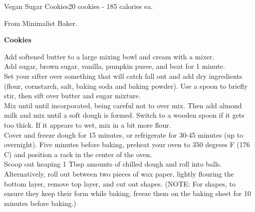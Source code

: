 \begin{recipe}{Vegan Sugar Cookies}{20 cookies - 185 calories ea.}{}

\freeform From Minimalist Baker.


\textbf{Cookies}

Add softened butter to a large mixing bowl and cream with a mixer.\\

Add sugar, brown sugar, vanilla, pumpkin puree, and beat for 1 minute.\\

Set your sifter over something that will catch fall out and add dry ingredients (flour, cornstarch, salt, baking soda and baking powder). Use a spoon to briefly stir, then sift over butter and sugar mixture.\\

Mix until until incorporated, being careful not to over mix. Then add almond milk and mix until a soft dough is formed. Switch to a wooden spoon if it gets too thick. If it appears to wet, mix in a bit more flour.\\

Cover and freeze dough for 15 minutes, or refrigerate for 30-45 minutes (up to overnight).
Five minutes before baking, preheat your oven to 350 degrees F (176 C) and position a rack in the center of the oven.\\

Scoop out heaping 1 Tbsp amounts of chilled dough and roll into balls. Alternatively, roll out between two pieces of wax paper, lightly flouring the bottom layer, remove top layer, and cut out shapes. (NOTE: For shapes, to ensure they keep their form while baking, freeze them on the baking sheet for 10 minutes before baking.)\\\newpage


\end{recipe}
